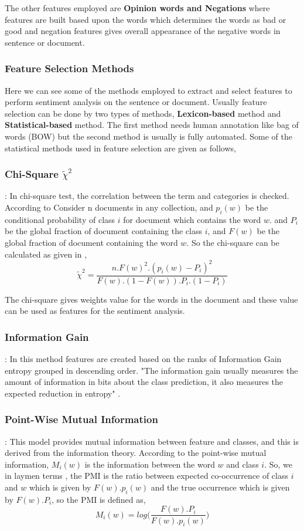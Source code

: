 \documentclass[sigconf]{acmart}
\begin{document}
The other features employed are \textbf{Opinion words and Negations} where features are built based upon the words which determines the words as bad or good and negation features gives overall appearance of the negative words in sentence or document.
\subsubsection{Feature Selection Methods} 
Here we can see some of the methods employed to extract and select features to perform sentiment analysis on the sentence or document. Usually feature selection can be done by two types of methods, \textbf{Lexicon-based} \cite{lexi} method and \textbf{Statistical-based} \cite{statis} method. The first method needs human annotation like bag of words (BOW) \cite{lexi} but the second method is usually is fully automated. Some of the statistical methods used in feature selection are given as follows,
\subsubsection*{Chi-Square $\tilde{\chi}^2$} : In chi-square test, the correlation between the term and categories is checked. According to \cite{sentianalysis} Consider n documents in any collection, and $p_{i}(w)$ be the conditional probability of class $i$ for document which contains the word $w$. and $P_{i}$ be the global fraction of document containing the class $i$, and $F(w)$ be the global fraction of document containing the word $w$. So the chi-square can be calculated as given in \cite{sentianalysis},
$$\tilde{\chi}^2 = \frac{n.F(w)^{2}.(p_{i}(w)-P_{i})^2}{F(w).(1-F(w)).P_{i}.(1-P_{i})}$$

The chi-square gives weights value for the words in the document and these value can be used as features for the sentiment analysis.

\subsubsection*{Information Gain} : In this method features are created based on the ranks of Information Gain entropy grouped in descending order. "The information gain usually measures the amount of information in bits about the class prediction, it also measures the expected reduction in entropy" \cite{Duch2006}.

\subsubsection*{Point-Wise Mutual Information} : This model provides mutual information between feature and classes, and this is derived from the information theory. According to \cite{sentianalysis} the point-wise mutual information, $M_i(w)$ is the information between the word $w$ and class $i$. So, we in laymen terms , the 
PMI \cite{sentianalysis} is the ratio between expected co-occurrence of class $i$ and $w$ which is given by $F(w).p_i(w)$ and the true occurrence which is given by $F(w).P_i$, so the PMI is defined as,
$$M_i(w) = log\bigg(\frac{F(w).P_i}{F(w).p_i(w)}\bigg)$$
\end{document}
